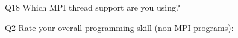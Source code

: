 \begin{description}%
\item{Q18} Which MPI thread support are you using?%
\item{Q2} Rate your overall programming skill (non-MPI programs):%
\end{description}%
